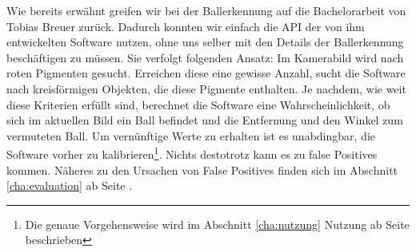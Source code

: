 Wie bereits erwähnt greifen wir bei der Ballerkennung auf die
Bachelorarbeit von Tobias Breuer zurück. Dadurch konnten wir einfach
die API der von ihm entwickelten Software nutzen, ohne uns selber mit
den Details der Ballerkennung beschäftigen zu müssen. Sie verfolgt
folgenden Ansatz: Im Kamerabild wird nach roten Pigmenten
gesucht. Erreichen diese eine gewisse Anzahl, sucht die Software nach
kreisförmigen Objekten, die diese Pigmente enthalten. Je nachdem,
wie weit diese Kriterien erfüllt sind, berechnet die Software eine
Wahrscheinlichkeit, ob sich im aktuellen Bild ein Ball befindet und
die Entfernung und den Winkel zum vermuteten Ball. Um vernünftige
Werte zu erhalten ist es unabdingbar, die Software vorher zu
kalibrieren\footnote{Die genaue Vorgehensweise wird im Abschnitt
\ref{cha:nutzung} Nutzung ab Seite \pageref{cha:nutzung} beschrieben}.  Nichts destotrotz kann es zu false Positives
kommen. Näheres zu den  Ursachen von
False Positives finden sich im Abschnitt \ref{cha:evaluation} ab Seite \pageref{cha:evaluation}.
